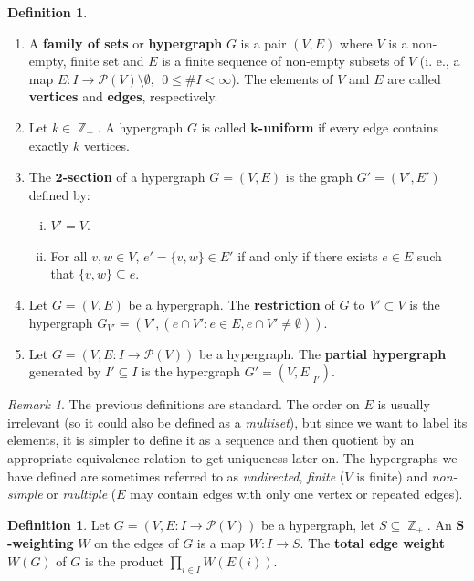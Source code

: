 \documentclass[a4paper,11pt]{amsart}
\theoremstyle{plain}
\theoremstyle{definition}
\newtheorem{definition}[theorem]{Definition}
\theoremstyle{remark}
\newtheorem{remark}[theorem]{Remark}
\DeclareMathOperator{\ZZ}{\mathbb{Z}}
\begin{document}
\begin{definition}
    \begin{enumerate}[1.]
        \item A \textbf{family of sets} or \textbf{hypergraph} $G$ is a pair $(V, E)$ where $V$ is a non-empty, finite set and $E$ is a finite sequence of non-empty subsets of $V$ (i. e., a map $E: I \to \mathcal{P}(V) \setminus \emptyset,~~0\leq \#I < \infty$). The elements of $V$ and $E$ are called \textbf{vertices} and \textbf{edges}, respectively.
        \item Let $k \in \ZZ_+$. A hypergraph $G$ is called \textbf{$\mathbf{k}$-uniform} if every edge contains exactly $k$ vertices.
        \item The \textbf{$\mathbf{2}$-section} of a hypergraph $G = (V, E)$ is the graph $G' = (V', E')$ defined by:
        \begin{enumerate}[i.]
            \item $V' = V$.
            \item For all $v, w \in V$, $e' = \{v, w\} \in E'$ if and only if there exists $e \in E$ such that $\{v, w\} \subseteq e$.
        \end{enumerate}
        \item Let $G = (V, E)$ be a hypergraph. The \textbf{restriction} of $G$ to $V' \subset V$ is the hypergraph $G_{V'} = (V', (e \cap V': e \in E, e \cap V' \neq \emptyset))$.
        \item Let $G = (V, E: I \to \mathcal{P}(V))$ be a hypergraph. The \textbf{partial hypergraph} generated by $I' \subseteq I$ is the hypergraph $G' = (V, E|_{I'})$.
    \end{enumerate}
\end{definition}

\begin{remark}
    The previous definitions are standard. The order on $E$ is usually irrelevant (so it could also be defined as a \emph{multiset}), but since we want to label its elements, it is simpler to define it as a sequence and then quotient by an appropriate equivalence relation to get uniqueness later on. The hypergraphs we have defined are sometimes referred to as \emph{undirected}, \emph{finite} ($V$ is finite) and \emph{non-simple} or \emph{multiple} ($E$ may contain edges with only one vertex or repeated edges).
\end{remark}

\begin{definition}
    Let $G = (V, E: I \to \mathcal{P}(V))$ be a hypergraph, let $S \subseteq \ZZ_+$. An \textbf{$\mathbf{S}$-weighting} $W$ on the edges of $G$ is a map $W: I \to S$. The \textbf{total edge weight} $W(G)$ of $G$ is the product $\prod_{i \in I} W(E(i))$.
\end{definition}
\end{document}
